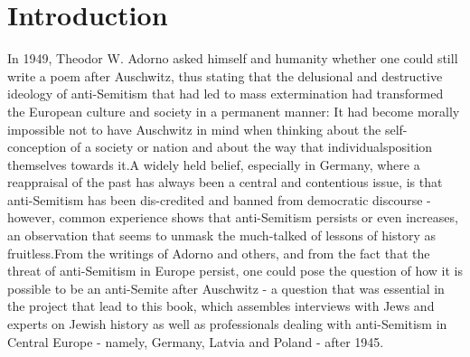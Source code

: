 \section{Introduction}

In 1949, Theodor W. Adorno asked himself and humanity whether one could still write a poem after Auschwitz, thus stating that the delusional and destructive ideology of anti-Semitism that had led to mass extermination had transformed the European culture and society in a permanent manner: It had become morally impossible not to have Auschwitz in mind when thinking about the self-conception of a society or nation and about the way that individualsposition themselves towards it.A widely held belief, especially in Germany, where a reappraisal of the past has always been a central and contentious issue, is that anti-Semitism has been dis-credited and banned from democratic discourse - however, common experience shows that anti-Semitism persists or even increases, an observation that seems to unmask the much-talked of lessons of history as fruitless.From the writings of Adorno and others, and from the fact that the threat of anti-Semitism in Europe persist, one could pose the question of how it is possible to be an anti-Semite after Auschwitz - a question that was essential in the project that lead to this book, which assembles interviews with Jews and experts on Jewish history as well as professionals dealing with anti-Semitism in Central Europe - namely, Germany, Latvia and Poland - after 1945.
